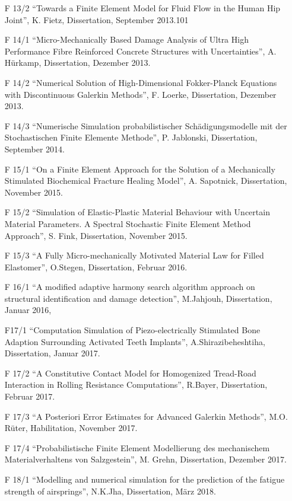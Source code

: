 \begin{itemize}
    \item[F 13/2] ``Towards a Finite Element Model for Fluid Flow in the Human Hip Joint”, K. Fietz, Dissertation, September 2013.101
    \item[F 14/1] ``Micro-Mechanically Based Damage Analysis of Ultra High Performance Fibre Reinforced Concrete Structures with Uncertainties”, A. Hürkamp, Dissertation, Dezember 2013.
    \item[F 14/2] ``Numerical Solution of High-Dimensional Fokker-Planck Equations with Discontinuous Galerkin Methods”, F. Loerke, Dissertation, Dezember 2013.
    \item[F 14/3] ``Numerische Simulation probabilistischer Schädigungsmodelle mit der Stochastischen Finite Elemente Methode”, P. Jablonski, Dissertation, September 2014.
    \item[F 15/1] ``On a Finite Element Approach for the Solution of a Mechanically Stimulated Biochemical Fracture Healing Model”, A. Sapotnick, Dissertation, November 2015.
    \item[F 15/2] ``Simulation of Elastic-Plastic Material Behaviour with Uncertain Material Parameters. A Spectral Stochastic Finite Element Method Approach”, S. Fink, Dissertation, November 2015.
    \item[F 15/3] ``A Fully Micro-mechanically Motivated Material Law for Filled Elastomer”, O.Stegen, Dissertation, Februar 2016.
    \item[F 16/1] ``A modified adaptive harmony search algorithm approach on structural identification and damage detection”, M.Jahjouh, Dissertation, Januar 2016,
    \item[F17/1] ``Computation Simulation of Piezo-electrically Stimulated Bone Adaption Surrounding Activated Teeth Implants”, A.Shirazibeheshtiha, Dissertation, Januar 2017.
    \item[F 17/2] ``A Constitutive Contact Model for Homogenized Tread-Road Interaction in Rolling Resistance Computations”, R.Bayer, Dissertation, Februar 2017.
    \item[F 17/3] ``A Posteriori Error Estimates for Advanced Galerkin Methods”, M.O. Rüter, Habilitation, November 2017.
    \item[F 17/4] ``Probabilistische Finite Element Modellierung des mechanischem Materialverhaltens von Salzgestein”, M. Grehn, Dissertation, Dezember 2017.
    \item[F 18/1] ``Modelling and numerical simulation for the prediction of the fatigue strength of airsprings”, N.K.Jha, Dissertation, März 2018.

\end{itemize}
